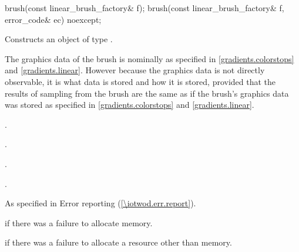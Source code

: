 \begin{itemdecl}
brush(const linear_brush_factory& f);
brush(const linear_brush_factory& f, error_code& ec) noexcept;
\end{itemdecl}
\begin{itemdescr}
\pnum
\effects
Constructs an object of type .

\pnum
The graphics data of the brush is nominally as specified in \ref{gradients.colorstops} and \ref{gradients.linear}. However because the graphics data is not directly observable, it is \unspecnorm what data is stored and how it is stored, provided that the results of sampling from the brush are the same as if the brush's graphics data was stored as specified in \ref{gradients.colorstops} and \ref{gradients.linear}.

\pnum
\postconditions
{}.

.

.

.

\pnum
\throws
As specified in Error reporting (\ref{\iotwod.err.report}).

\pnum
\errors
{} if there was a failure to allocate memory.

 if there was a failure to allocate a resource other than memory.
\end{itemdescr}

